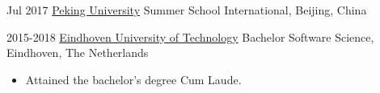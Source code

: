 {      \customcventry
     {Jul 2017}
     {\color{blue}\href{http://www.oir.pku.edu.cn/summerschool/}{Peking University}}
     {Summer School International,}
     {Beijing, China}
     {}{}
     {
     }
     
     \customcventry
     {2015-2018}
     {\color{blue}\href{https://tue.nl/}{Eindhoven University of Technology}}
     {Bachelor Software Science,}
     {Eindhoven, The Netherlands}{}{}
     {
     	\begin{itemize}[leftmargin=0.6cm, label={\textbullet}]
     		\item Attained the bachelor's degree Cum Laude. 
     	\end{itemize}
     }
}

